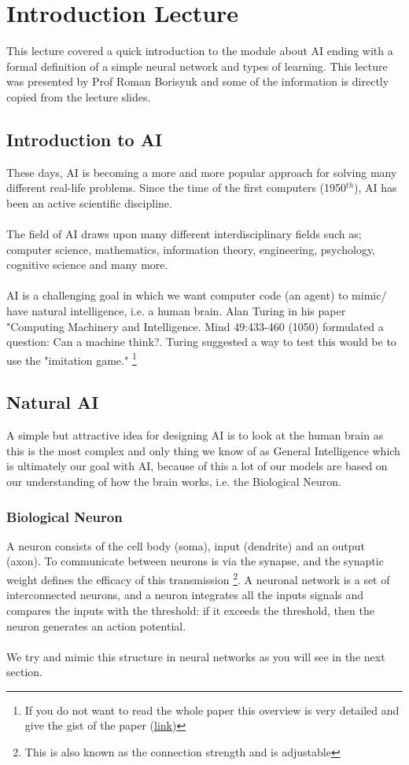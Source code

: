 \section{Introduction Lecture}
This lecture covered a quick introduction to the module about AI ending with a formal definition of a simple neural network and types of learning. This lecture was presented by Prof Roman Borisyuk and some of the information is directly copied from the lecture slides.
\subsection{Introduction to AI}
These days, AI is becoming a more and more popular approach for solving many different real-life problems. Since the time of the first computers (1950$^{th}$), AI has been an active scientific discipline.
\\\\
The field of AI draws upon many different interdisciplinary fields such as; computer science, mathematics, information theory, engineering, psychology, cognitive science and many more.
\\\\
AI is a challenging goal in which we want computer code (an agent) to mimic/ have natural intelligence, i.e. a human brain. Alan Turing in his paper "Computing Machinery and Intelligence. Mind 49:433-460 (1050) formulated a question: Can a machine think?. Turing suggested a way to test this would be to use the "imitation game."
\footnote{If you do not want to read the whole paper this overview is very detailed and give the gist of the paper (\href{https://blog.acolyer.org/2017/10/20/computing-machinery-and-intelligence/}{link})}
\subsection{Natural AI}
A simple but attractive idea for designing AI is to look at the human brain as this is the most complex and only thing we know of as General Intelligence which is ultimately our goal with AI, because of this a lot of our models are based on our understanding of how the brain works, i.e. the Biological Neuron.
\subsubsection{Biological Neuron}
A neuron consists of the cell body (soma), input (dendrite) and an output (axon). To communicate between neurons is via the synapse, and the synaptic weight defines the efficacy of this transmission \footnote{This is also known as the connection strength and is adjustable}. A neuronal network is a set of interconnected neurons, and a neuron integrates all the inputs signals and compares the inputs with the threshold: if it exceeds the threshold, then the neuron generates an action potential.
\\\\
We try and mimic this structure in neural networks as you will see in the next section.
\newpage
